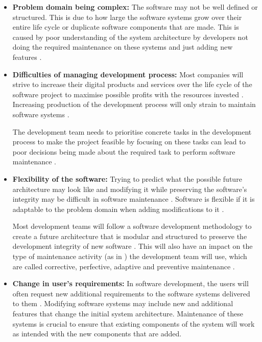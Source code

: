 \begin{itemize}
	\item \textbf{Problem domain being complex:} The software may not be well defined or structured. This is due to how large the software systems grow over their entire life cycle or duplicate software components that are made. This is caused by poor understanding of the system architecture by developers not doing the required maintenance on these systems and just adding new features \cite{Galster2019, Booch1986}.
	\item \textbf{Difficulties of managing development process:} Most companies will strive to increase their digital products and services over the life cycle of the software project to maximise possible profits with the resources invested \cite{Niu2018}. Increasing production of the development process will only strain to maintain software systems \cite{Sneed2004}.\par The development team needs to prioritise concrete tasks in the development process to make the project feasible by focusing on these tasks can lead to poor decisions being made about the required task to perform software maintenance \cite{Galster2019, Ogheneovo2014, Lenarduzzi2017}. 
	\item \textbf{Flexibility of the software:} Trying to predict what the possible future architecture may look like and modifying it while preserving the software's integrity may be difficult in software maintenance \cite{Garlan1999}. Software is flexible if it is adaptable to the problem domain when adding modifications to it \cite{Ogheneovo2014}.\par Most development teams will follow a software development methodology to create a future architecture that is modular and structured to preserve the development integrity of new software \cite{Vijayasarathy2016, Rehman2018}. This will also have an impact on the type of maintenance activity (as in ) the development team will use, which are called corrective, perfective, adaptive and preventive maintenance \cite{Thamburaj2017, Hasan2012, Stojanov2017, Snipes2018}.
	\item \textbf{Change in user's requirements:} In software development, the users will often request new additional requirements to the software systems delivered to them \cite{Ogheneovo2014}. Modifying software systems may include new and additional features that change the initial system architecture. Maintenance of these systems is crucial to ensure that existing components of the system will work as intended with the new components that are added.
\end{itemize}

